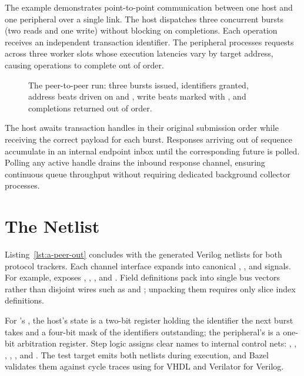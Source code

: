 \documentclass[journal,9pt]{IEEEtran}
\begin{document}
The example  demonstrates point-to-point communication between
one host and one peripheral over a single link. The host dispatches three
concurrent bursts (two reads and one write) without blocking on completions.
Each operation receives an independent transaction identifier. The
peripheral processes requests across three worker slots whose execution
latencies vary by target address, causing operations to complete out of order.

\begin{figure}[t]
\centering

\caption{The peer-to-peer run: three bursts issued, identifiers granted,
address beats driven on  and , write beats marked with
, and completions returned out of order.}
\label{fig:a-peer}
\end{figure}





The host awaits transaction handles in their original submission order while
receiving the correct payload for each burst. Responses arriving out of
sequence accumulate in an internal endpoint inbox until the corresponding
future is polled. Polling any active handle drains the inbound response
channel, ensuring continuous queue throughput without requiring dedicated
background collector processes.

\section{The Netlist}
\label{sec:a-netlist}

Listing~\ref{lst:a-peer-out} concludes with the generated Verilog netlists
for both protocol trackers. Each channel interface expands into canonical
, , and  signals. For example,
 exposes , , ,
and . Field definitions pack into single bus vectors rather
than disjoint wires such as  and ; unpacking them
requires only slice index definitions.

For 's , the host's state is
a two-bit register holding the identifier the next burst takes and a
four-bit mask of the identifiers outstanding; the peripheral's is a
one-bit arbitration register. Step logic assigns clear names to
internal control nets: , , , ,
, and . The test target  emits
both netlists during execution, and Bazel validates them against cycle
traces using  for VHDL and Verilator for Verilog.
\end{document}
